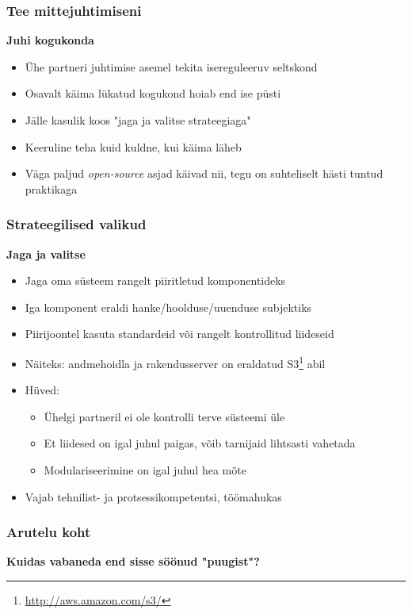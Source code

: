 \begin{frame}[fragile]
  \frametitle{Tee mittejuhtimiseni}
	\textbf{Juhi kogukonda}
	\begin{itemize}
		\item Ühe partneri juhtimise asemel tekita isereguleeruv seltskond 
		\item Osavalt käima lükatud kogukond hoiab end ise püsti
		\item Jälle kasulik koos "jaga ja valitse strateegiaga"
		\item Keeruline teha kuid kuldne, kui käima läheb
		\item Väga paljud \emph{open-source} asjad käivad nii, tegu on suhteliselt hästi tuntud praktikaga
	\end{itemize}
\end{frame}

\begin{frame}[fragile]
  \frametitle{Strateegilised valikud}
	\textbf{	Jaga ja valitse}
	\begin{itemize}
		\item Jaga oma süsteem rangelt piiritletud komponentideks 
		\item Iga komponent eraldi hanke/hoolduse/uuenduse subjektiks
		\item Piirijoontel kasuta standardeid või rangelt kontrollitud liideseid
		\item Näiteks: andmehoidla ja rakendusserver on eraldatud S3\footnote{\url{http://aws.amazon.com/s3/}} abil
		\item Hüved:
		\begin{itemize}
			\item Ühelgi partneril ei ole kontrolli terve süsteemi üle
			\item Et liidesed on igal juhul paigas, võib tarnijaid lihtsasti vahetada
			\item Modulariseerimine on igal juhul hea mõte
		\end{itemize}
		\item Vajab tehnilist- ja protsessikompetentsi, töömahukas
	\end{itemize}
\end{frame}


\begin{frame}[fragile]
  \frametitle{Arutelu koht}
		\begin{center}
			\textbf{Kuidas vabaneda end sisse söönud "puugist"?}
		\end{center}
\end{frame}

